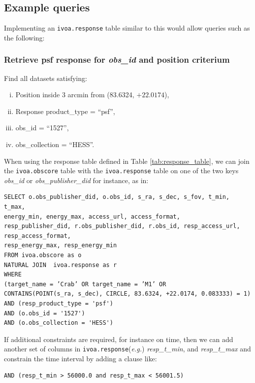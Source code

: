 \subsection*{Example queries}
\noindent Implementing an {\tt ivoa.response} table similar to this would allow queries such as the following: \\
\subsubsection*{Retrieve psf response for {\em obs\_id} and position criterium }
\noindent Find all datasets satisfying:
\begin{enumerate}[(i)]
 \item Position inside 3 arcmin from (83.6324, $+22.0174$),
 \item Response product\_type = ``psf'',
 \item obs\_id = ``1527'',
 \item obs\_collection = ``HESS''.
\end{enumerate}

When using the response table defined in Table \ref{tab:response_table}, we can join the {\tt ivoa.obscore} table with the {\tt ivoa.response} table on 
one of the two keys  {\em obs\_id\/} or {\em obs\_publisher\_did\/} for instance, as in: 
{\small
\begin{verbatim}
SELECT o.obs_publisher_did, o.obs_id, s_ra, s_dec, s_fov, t_min, t_max, 
energy_min, energy_max, access_url, access_format, 
resp_publisher_did, r.obs_publisher_did, r.obs_id, resp_access_url, resp_access_format, 
resp_energy_max, resp_energy_min
FROM ivoa.obscore as o
NATURAL JOIN  ivoa.response as r
WHERE
(target_name = ’Crab’ OR target_name = ’M1’ OR
CONTAINS(POINT(s_ra, s_dec), CIRCLE, 83.6324, +22.0174, 0.083333) = 1)
AND (resp_product_type = 'psf')
AND (o.obs_id = '1527')
AND (o.obs_collection = 'HESS')
\end{verbatim}
}
If additional constraints are required, for instance on time, then we can add another set of columns  in {\tt ivoa.response}({\em e.g.\/}) {\em resp\_t\_min\/}, and {\em resp\_t\_max\/} and constrain the time interval by adding a clause like:
{\small
\begin{verbatim}
AND (resp_t_min > 56000.0 and resp_t_max < 56001.5) 
\end{verbatim}
}

